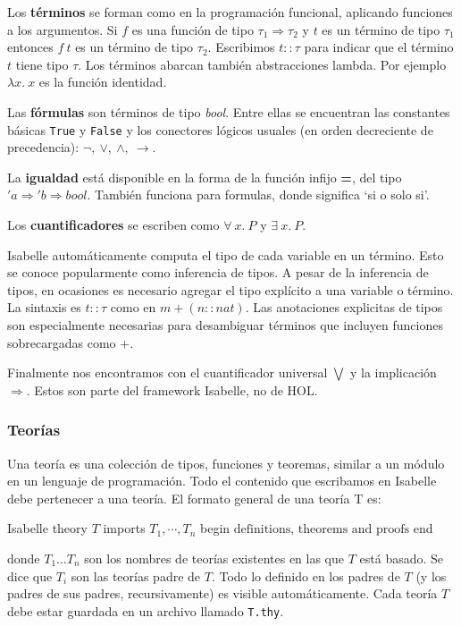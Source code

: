 \documentclass[12pt]{book}
\begin{document}
Los \textbf{términos} se forman como en la programación funcional, aplicando funciones a los argumentos. Si $f$ es una función de tipo $\tau_1 \Rightarrow \tau_2$ y $t$ es un término de tipo $\tau_1$ entonces $f\ t$ es un término de tipo $\tau_2$. Escribimos $t :: \tau$ para indicar que el término $t$ tiene tipo $\tau$. Los términos abarcan también abstracciones lambda. Por ejemplo $\lambda x.\ x$ es la función identidad.

Las \textbf{fórmulas} son términos de tipo \textit{bool}. Entre ellas se encuentran las constantes básicas \texttt{True} y \texttt{False} y los conectores lógicos usuales (en orden decreciente de precedencia): $\neg,\ \vee,\ \wedge,\ \rightarrow$.

La \textbf{igualdad} está disponible en la forma de la función infijo \textbf{=}, del tipo $'a \Rightarrow 'b \Rightarrow  bool$. También funciona para formulas, donde significa `si o solo si'.

Los \textbf{cuantificadores} se escriben como $\forall\ x.\ P$ y $\exists\ x.\ P$.

Isabelle automáticamente computa el tipo de cada variable en un término. Esto se conoce popularmente como inferencia de tipos. A pesar de la inferencia de tipos, en ocasiones es necesario agregar el tipo explícito a una variable o término. La sintaxis es $t :: \tau$ como en $m + (n::nat)$. Las anotaciones explicitas de tipos son especialmente necesarias para desambiguar términos que incluyen funciones sobrecargadas como $+$.

Finalmente nos encontramos con el cuantificador universal $\bigvee$ y la implicación $\Longrightarrow$. Estos son parte del framework Isabelle, no de HOL.\@

\subsubsection{Teorías}

Una teoría es una colección de tipos, funciones y teoremas, similar a un módulo en un lenguaje de programación. Todo el contenido que escribamos en Isabelle debe pertenecer a una teoría. El formato general de una teoría T es:

\begin{code}[title=Estructura general de un archivo de prueba]{Isabelle}
theory $T$
imports $T_1, \cdots, T_n$
begin
$\text{definitions, theorems and proofs}$
end
\end{code}

donde $T_1 \ldots T_n$ son los nombres de teorías existentes en las que $T$ está basado. Se dice que $T_i$ son las teorías padre de $T$. Todo lo definido en los padres de $T$ (y los padres de sus padres, recursivamente) es visible automáticamente. Cada teoría $T$ debe estar guardada en un archivo llamado \texttt{T.thy}.
\end{document}

